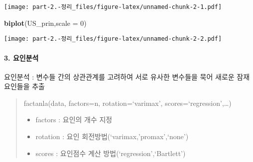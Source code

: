 \documentclass[
]{article}
\newenvironment{Shaded}{\begin{snugshade}}{\end{snugshade}}
\newcommand{\AttributeTok}[1]{\textcolor[rgb]{0.13,0.29,0.53}{#1}}
\newcommand{\CommentTok}[1]{\textcolor[rgb]{0.56,0.35,0.01}{\textit{#1}}}
\newcommand{\ConstantTok}[1]{\textcolor[rgb]{0.56,0.35,0.01}{#1}}
\newcommand{\DecValTok}[1]{\textcolor[rgb]{0.00,0.00,0.81}{#1}}
\newcommand{\FunctionTok}[1]{\textcolor[rgb]{0.13,0.29,0.53}{\textbf{#1}}}
\newcommand{\NormalTok}[1]{#1}
\newcommand{\OtherTok}[1]{\textcolor[rgb]{0.56,0.35,0.01}{#1}}
\newcommand{\SpecialCharTok}[1]{\textcolor[rgb]{0.81,0.36,0.00}{\textbf{#1}}}
\newcommand{\StringTok}[1]{\textcolor[rgb]{0.31,0.60,0.02}{#1}}
\begin{document}
\texttt{[image: part-2.-정리\_files/figure-latex/unnamed-chunk-2-1.pdf]}

\begin{Shaded}
\begin{Highlighting}[]
\FunctionTok{biplot}\NormalTok{(US\_prin,}\AttributeTok{scale =} \DecValTok{0}\NormalTok{)}
\end{Highlighting}
\end{Shaded}

\texttt{[image: part-2.-정리\_files/figure-latex/unnamed-chunk-2-2.pdf]}

\hypertarget{uxc694uxc778uxbd84uxc11d}{%
\paragraph{3. 요인분석}\label{uxc694uxc778uxbd84uxc11d}}

요인분석 : 변수들 간의 상관관계를 고려하여 서로 유사한 변수들을 묵어
새로운 잠재요인들을 추출

\begin{quote}
factanla(data, factors=n, rotation=`varimax',
scores=`regression',\ldots)

\begin{itemize}
\item
  factors : 요인의 개수 지정
\item
  rotation : 요인 회전방법(`varimax,'promax',`none')
\item
  scores : 요인점수 계산 방법(`regression',`Bartlett')
\end{itemize}
\end{quote}

\begin{Shaded}
\end{Shaded}
\end{document}
